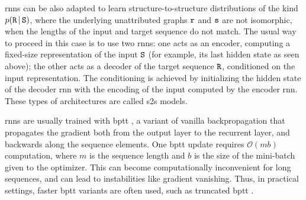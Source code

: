 \glspl{rnn} can be also adapted to learn structure-to-structure distributions of the kind $p(\AttrGraph{R} \given \AttrGraph{S})$, where the underlying unattributed graphs $\mathtt{r}$ and $\mathtt{s}$ are not isomorphic, \ie when the lengths of the input and target sequence do not match. The usual way to proceed in this case is to use two \glspl{rnn}: one acts as an encoder, computing a fixed-size representation of the input $\AttrGraph{S}$ (for example, its last hidden state as seen above); the other acts as a decoder of the target sequence $\AttrGraph{R}$, conditioned on the input representation. The conditioning is achieved by initializing the hidden state of the decoder \gls{rnn} with the encoding of the input computed by the encoder \gls{rnn}. These types of architectures are called \gls{s2s} models.

\glspl{rnn} are usually trained with \gls{bptt} \citep{werbos1988backpropthroughtime}, a variant of vanilla backpropagation that propagates the gradient both from the output layer to the recurrent layer, and backwards along the sequence elements. One \gls{bptt} update requires $\mathcal{O}(mb)$ computation, where $m$ is the sequence length and $b$ is the size of the mini-batch given to the optimizer. This can become computationally inconvenient for long sequences, and can lead to instabilities like gradient vanishing. Thus, in practical settings, faster \gls{bptt} variants are often used, such as truncated \gls{bptt} \citep{jaeger2002truncatedbptt}.


